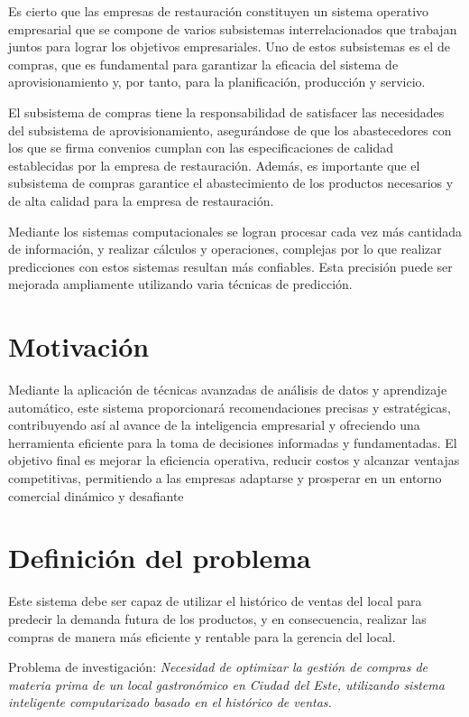 Es cierto que las empresas de restauración constituyen un sistema operativo empresarial que se compone de varios subsistemas interrelacionados que trabajan juntos para lograr los objetivos empresariales. Uno de estos subsistemas es el de compras, que es fundamental para garantizar la eficacia del sistema de aprovisionamiento y, por tanto, para la planificación, producción y servicio.

El subsistema de compras tiene la responsabilidad de satisfacer las necesidades del subsistema de aprovisionamiento, asegurándose de que los abastecedores con los que se firma convenios cumplan con las especificaciones de calidad establecidas por la empresa de restauración. Además, es importante que el subsistema de compras garantice el abastecimiento de los productos necesarios y de alta calidad para la empresa de restauración.

Mediante los sistemas computacionales se logran procesar cada vez más cantidada de información, y realizar cálculos y operaciones, complejas por lo que realizar predicciones con estos sistemas resultan más confiables. Esta precisión puede ser mejorada ampliamente utilizando varia técnicas de predicción.
\section{Motivación}
Mediante la aplicación de técnicas avanzadas de análisis de datos y aprendizaje automático, este sistema proporcionará recomendaciones
precisas y estratégicas, contribuyendo así al avance de la inteligencia empresarial y ofreciendo una herramienta eficiente para la toma de
decisiones informadas y fundamentadas. El objetivo final es mejorar la
eficiencia operativa, reducir costos y alcanzar ventajas competitivas, permitiendo a las empresas adaptarse y prosperar en un entorno comercial dinámico y desafiante

\section{Definición del problema}
 Este sistema debe ser capaz de utilizar el histórico de ventas del local para predecir
la demanda futura de los productos, y en consecuencia, realizar las compras
de manera más eficiente y rentable para la gerencia del local.

Problema de investigación: \textit{Necesidad de optimizar la gestión de compras de materia prima de un
local gastronómico en Ciudad del Este, utilizando sistema inteligente computarizado basado en el histórico de ventas.}

